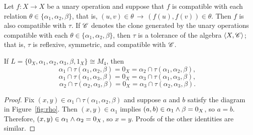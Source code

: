 Let $f: X\to X$ be a unary operation and suppose that $f$ is compatible with each
relation $\theta \in \{\alpha_1, \alpha_2, \beta\}$, that is, 
$(u,v)\in \theta \, \longrightarrow \, (f(u), f(v))\in \theta$.  Then $f$ is also
compatible with $\tau$. %
If $\mathscr{C}$ denotes the clone generated by the unary operations compatible 
with each $\theta \in \{\alpha_1, \alpha_2, \beta\}$, then $\tau$ is a tolerance
of the algebra $\langle X, \mathscr{C}\rangle$; that is, $\tau$ is reflexive, symmetric, and 
compatible with $\mathscr{C}$.

\begin{fact} If 
$L = \{0_X, \alpha_1, \alpha_2, \alpha_3, \beta, 1_X\} \cong  M_4$,
then
  \[
\alpha_1 \cap \tau(\alpha_1, \alpha_2, \beta)
= 0_X =  \alpha_2 \cap \tau(\alpha_1, \alpha_2, \beta),
\]
\[
\alpha_1 \cap \tau(\alpha_1, \alpha_3, \beta)
= 0_X =  \alpha_3 \cap \tau(\alpha_1, \alpha_3, \beta),
\]
\[
\alpha_2 \cap \tau(\alpha_2, \alpha_3, \beta)
 = 0_X = \alpha_3 \cap \tau(\alpha_2, \alpha_3, \beta).
\]
\end{fact}
\begin{proof}
  Fix $(x,y) \in  \alpha_1 \cap \tau(\alpha_1, \alpha_2, \beta)$ and suppose 
  $a$ and $b$ satisfy the diagram in Figure~\ref{fig:rho}.  Then 
  $(x,y) \in \alpha_1$ implies $(a, b)\in \alpha_1 \wedge \beta = 0_X$, so 
  $a = b$.  Therefore, $(x,y) \in \alpha_1 \wedge \alpha_2 = 0_X$, so $x = y$.
  Proofs of the other identities are similar.
\end{proof}

